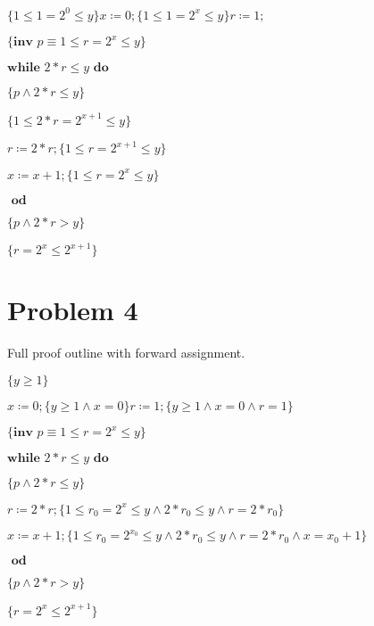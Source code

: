 \documentclass{article}
\begin{document}
$ \{1 \leq 1=2^0 \leq y\} x \coloneqq0;\{1 \leq 1=2^x \leq y\} r \coloneqq 1; $

$\{\textbf{inv }p \equiv 1 \leq r=2^x \leq y \}$

$ \textbf{while } 2*r \leq y \textbf{ do }$

\qquad \qquad $\{p \wedge 2*r \leq y \}$

\qquad \qquad $\{1 \leq 2*r=2^{x+1} \leq y \}$

\qquad \qquad $r \coloneqq 2*r;\{1 \leq r=2^{x+1} \leq y\}$

\qquad \qquad $x \coloneqq x+1;\{1 \leq r=2^x \leq y \}$

$ \textbf { od}$

$ \{p \wedge 2*r > y \}$

$ \{r=2^x \leq 2^{x+1} \}$


\section*{Problem 4}

Full proof outline with forward assignment.

\vspace{10pt}

$ \{y \geq 1\} $

$ x \coloneqq0;\{y \geq 1 \wedge x=0\} r \coloneqq 1; \{y \geq 1 \wedge x=0 \wedge r=1\}$

$\{\textbf{inv }p \equiv 1 \leq r=2^x \leq y \}$

$ \textbf{while } 2*r \leq y \textbf{ do }$

\qquad \qquad $\{p \wedge 2*r \leq y \}$

\qquad \qquad $r \coloneqq 2*r;\{1 \leq r_0=2^x \leq y \wedge 2*r_0 \leq y \wedge r=2*r_0 \}$

\qquad \qquad $x \coloneqq x+1;\{1 \leq r_0=2^{x_0} \leq y \wedge 2*r_0 \leq y \wedge r=2*r_0 \wedge x=x_0+1 \}$

$ \textbf { od}$

$ \{p \wedge 2*r > y \}$

$ \{r=2^x \leq 2^{x+1} \}$
\end{document}
